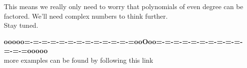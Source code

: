 \documentclass{ximera}
\begin{document}
This means we really only need to worry that polynomials of even degree can be factored.  We'll need complex numbers to think further. \\


Stay tuned.

























\begin{center}
\textbf{\textcolor{green!50!black}{ooooo=-=-=-=-=-=-=-=-=-=-=-=-=ooOoo=-=-=-=-=-=-=-=-=-=-=-=-=ooooo}} \\

more examples can be found by following this link\\ 

\end{center}
\end{document}
